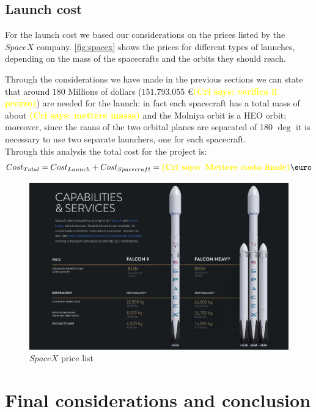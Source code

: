 \documentclass[11pt,a4paper,titlepage]{article}
\newcommand{\cri}[1]{\textcolor{yellow}{\textbf{(Cri says: #1)}}}
\begin{document}
	\subsection{Launch cost}
For the launch cost we based our considerations on the prices listed by the $SpaceX$ company. \autoref{fig:spacex} shows the prices for different types of launches, depending on the mass of the spacecrafts and the orbits they should reach.

Through the considerations we have made in the previous sections we can state that around $180$ Millions of dollars ($151.793.055$ \euro \cri{verifica il prezzo}) are needed for the launch: in fact each spacecraft has a total mass of about \cri{mettere massa} and the Molniya orbit is a HEO orbit; moreover, since the raans of the two orbital planes are separated of 180 $\deg$ it is necessary to use two separate launchers, one for each spacecraft.\\

Through this analysis the total cost for the project is:
\begin{equation}
Cost_{Total} = Cost_{Launch} + Cost_{Spacecraft} = \cri{Mettere costo finale} \text{\euro}
\end{equation}

\begin{figure}
\centering
\includegraphics[width = .9\textwidth]{Spacex.png}
\caption{$SpaceX$ price list}
\label{fig:spacex}
\end{figure}

\section{Final considerations and conclusion}
\lipsum[1]
\end{document}
